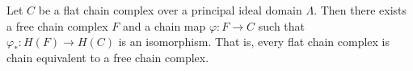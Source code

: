 Let $C$ be a flat chain complex over a principal ideal domain $\Lambda$. Then there exists a free chain complex $F$ and a chain map $\varphi : F \rightarrow C$ such that $\varphi_* : H(F) \rightarrow H(C)$ is an isomorphism. That is, every flat chain complex is chain equivalent to a free chain complex.
